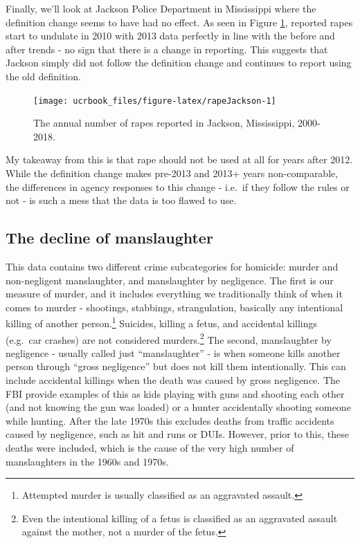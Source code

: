 \documentclass[
  12pt,
  openany]{book}
\begin{document}
Finally, we'll look at Jackson Police Department in Mississippi where the definition change seems to have had no effect. As seen in Figure \ref{fig:rapeJackson}, reported rapes start to undulate in 2010 with 2013 data perfectly in line with the before and after trends - no sign that there is a change in reporting. This suggests that Jackson simply did not follow the definition change and continues to report using the old definition.

\begin{figure}

{\centering \texttt{[image: ucrbook\_files/figure-latex/rapeJackson-1]} 

}

\caption{The annual number of rapes reported in Jackson, Mississippi, 2000-2018.}\label{fig:rapeJackson}
\end{figure}

My takeaway from this is that rape should not be used at all for years after 2012. While the definition change makes pre-2013 and 2013+ years non-comparable, the differences in agency responses to this change - i.e.~if they follow the rules or not - is such a mess that the data is too flawed to use.

\hypertarget{the-decline-of-manslaughter}{%
\subsection{The decline of manslaughter}\label{the-decline-of-manslaughter}}

This data contains two different crime subcategories for homicide: murder and non-negligent manslaughter, and manslaughter by negligence. The first is our measure of murder, and it includes everything we traditionally think of when it comes to murder - shootings, stabbings, strangulation, basically any intentional killing of another person.\footnote{Attempted murder is usually classified as an aggravated assault.} Suicides, killing a fetus, and accidental killings (e.g.~car crashes) are not considered murders.\footnote{Even the intentional killing of a fetus is classified as an aggravated assault against the mother, not a murder of the fetus.} The second, manslaughter by negligence - usually called just ``manslaughter'' - is when someone kills another person through ``gross negligence'' but does not kill them intentionally. This can include accidental killings when the death was caused by gross negligence. The FBI provide examples of this as kids playing with guns and shooting each other (and not knowing the gun was loaded) or a hunter accidentally shooting someone while hunting. After the late 1970s this excludes deaths from traffic accidents caused by negligence, such as hit and runs or DUIs. However, prior to this, these deaths were included, which is the cause of the very high number of manslaughters in the 1960s and 1970s.
\end{document}
